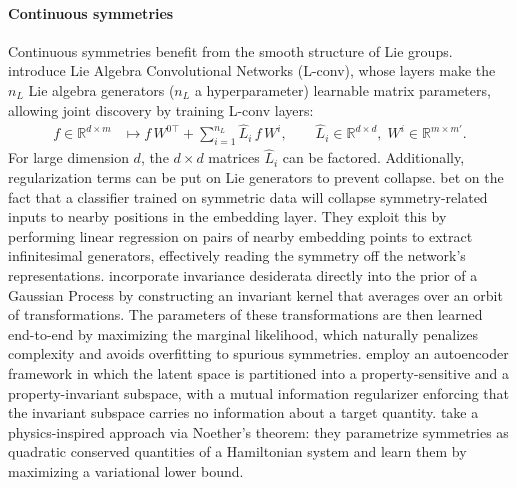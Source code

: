 \documentclass[mathematics,review,submit,moreauthors]{Definitions/mdpi}
\begin{document}
\paragraph{Continuous symmetries}
Continuous symmetries benefit from the smooth structure of Lie groups.
\citet{dehmamy2021anips} introduce Lie Algebra Convolutional Networks (L-conv), whose layers make the $n_L$ Lie algebra generators ($n_L$ a hyperparameter) learnable matrix parameters, allowing joint discovery by training L-conv layers:
\begin{equation}
    \begin{aligned}
        f \in \mathbb R^{d\times m} &\mapsto f\,W^{0\top} + \sum_{i=1}^{n_L} \hat L_i\, f\, W^i, \qquad \hat L_i \in \mathbb R^{d\times d},\; W^i \in \mathbb R^{m\times m'}.
    \end{aligned}
\end{equation}
For large dimension $d$, the $d\times d$ matrices $\hat L_i$ can be factored.
Additionally, regularization terms can be put on Lie generators \citep{escriche2025} to prevent collapse.
\citet{krippendorf2020} bet on the fact that a classifier trained on symmetric data will collapse symmetry-related inputs to nearby positions in the embedding layer.
They exploit this by performing linear regression on pairs of nearby embedding points to extract infinitesimal generators, effectively reading the symmetry off the network's representations.
\citet{vanderwilk2018anips} incorporate invariance desiderata directly into the prior of a Gaussian Process by constructing an invariant kernel that averages over an orbit of transformations.
The parameters of these transformations are then learned end-to-end by maximizing the marginal likelihood, which naturally penalizes complexity and avoids overfitting to spurious symmetries.
\citet{wieser2020anips} employ an autoencoder framework in which the latent space is partitioned into a property-sensitive and a property-invariant subspace, with a mutual information regularizer enforcing that the invariant subspace carries no information about a target quantity.
\citet{ouderaa2024} take a physics-inspired approach via Noether's theorem: they parametrize symmetries as quadratic conserved quantities of a Hamiltonian system and learn them by maximizing a variational lower bound.
\end{document}
